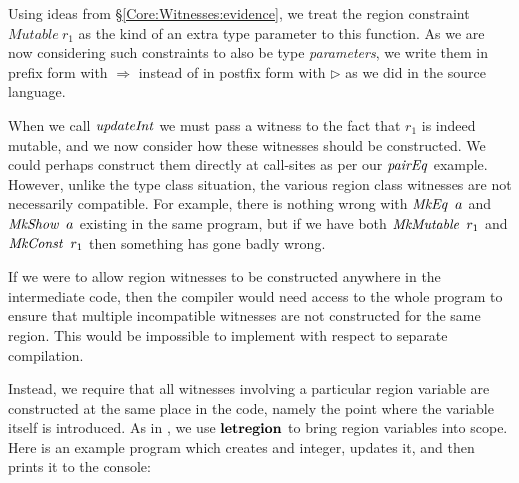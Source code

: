 Using ideas from \S\ref{Core:Witnesses:evidence}, we treat the region constraint \mbox{$Mutable \ r_1$} as the kind of an extra type parameter to this function. As we are now considering such constraints to also be type \emph{parameters}, we write them in prefix form with $\Rightarrow$ instead of in postfix form with $\rhd$ as we did in the source language.

When we call $\operatorname{\mathit{updateInt}}$ we must pass a witness to the fact that $r_1$ is indeed mutable, and we now consider how these witnesses should be constructed. We could perhaps construct them directly at call-sites as per our $\operatorname{\mathit{pairEq}}$ example. However, unlike the type class situation, the various region class witnesses are not necessarily compatible. For example, there is nothing wrong with  $\operatorname{\mathit{MkEq}} \ a$ and $\operatorname{\mathit{MkShow}} \ a$ existing in the same program, but if we have both $\operatorname{\mathit{MkMutable}} \ r_1$ and $\operatorname{\mathit{MkConst}} \ r_1$ then something has gone badly wrong.

If we were to allow region witnesses to be constructed anywhere in the intermediate code, then the compiler would need access to the whole program to ensure that multiple incompatible witnesses are not constructed for the same region. This would be impossible to implement with respect to separate compilation.

Instead, we require that all witnesses involving a particular region variable are constructed at the same place in the code, namely the point where the variable itself is introduced. As in \cite{tofte:mlkit-4.3.0}, we use $\textrm{\textbf{letregion}}$ to bring region variables into scope. Here is an example program which creates and integer, updates it, and then prints it to the console:

\code{
	$\iprintMe :: \ () \to ()$ \\
}

\vspace{-3ex}

\vspace{-3ex}

